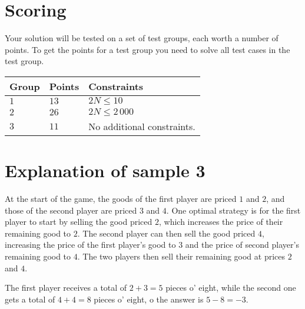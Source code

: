 \section*{Scoring}
Your solution will be tested on a set of test groups, each worth a number of points.
To get the points for a test group you need to solve all test cases in the test group.

\noindent
\begin{tabular}{| l | l | l |}
  \hline
  Group & Points & Constraints \\ \hline
  $1$    & $13$        &  $2N \le 10$ \\ \hline
  $2$    & $26$        &  $2N \le 2\,000$ \\ \hline
  $3$    & $11$        &  No additional constraints. \\ \hline
\end{tabular}

\section*{Explanation of sample 3}
At the start of the game, the goods of the first player are priced $1$ and $2$, and those of the second player are priced $3$ and $4$.
One optimal strategy is for the first player to start by selling the good priced $2$, which increases the price of their remaining good to $2$.
The second player can then sell the good priced $4$, increasing the price of the first player's good to $3$ and the price of second player's remaining good to $4$.
The two players then sell their remaining good at prices $2$ and $4$.

The first player receives a total of $2 + 3 = 5$ pieces o' eight, while the second one gets a total of $4 + 4 = 8$ pieces o' eight, o the answer is $5 - 8 = -3$.
